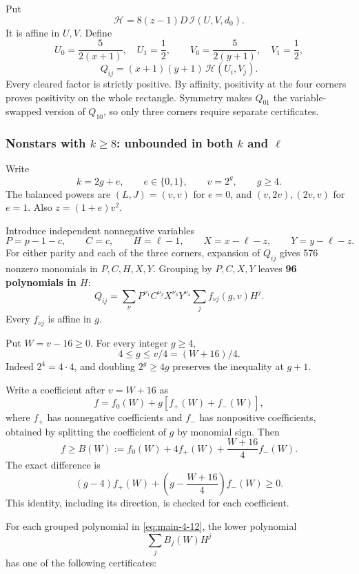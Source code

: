 \documentclass[11pt,letterpaper]{article}
\theoremstyle{plain}
\begin{document}
Put \[
\mathcal H=8(z-1)D\,\mathcal I(U,V,d_0).
\tag{4.9}\label{eq:main-4-9}
\] It is affine in \(U,V\). Define \[
U_0=\frac5{2(x+1)},\quad U_1=\frac12,
\qquad
V_0=\frac5{2(y+1)},\quad V_1=\frac12,
\] \[
Q_{ij}=(x+1)(y+1)\,\mathcal H(U_i,V_j).
\tag{4.10}\label{eq:main-4-10}
\] Every cleared factor is strictly positive. By affinity, positivity at the four corners proves positivity on the whole rectangle. Symmetry makes \(Q_{01}\) the variable-swapped version of \(Q_{10}\), so only three corners require separate certificates.

\subsubsection*{\texorpdfstring{Nonstars with \(k\ge8\): unbounded in both \(k\) and \(\ell\)}{Nonstars with k >= 8: unbounded in k and ell}}\label{nonstars-with-kge8-unbounded-in-both-k-and-ell}

Write \[
k=2g+e,\qquad e\in\{0,1\},\qquad v=2^g,\qquad g\ge4.
\] The balanced powers are \((L,J)=(v,v)\) for \(e=0\), and \((v,2v),(2v,v)\) for \(e=1\). Also \(z=(1+e)v^2\).

Introduce independent nonnegative variables \[
P=p-1-c,\qquad C=c,\qquad H=\ell-1,
\qquad X=x-\ell-z,\qquad Y=y-\ell-z.
\tag{4.11}\label{eq:main-4-11}
\] For either parity and each of the three corners, expansion of \(Q_{ij}\) gives 576 nonzero monomials in \(P,C,H,X,Y\). Grouping by \(P,C,X,Y\) leaves \textbf{96 polynomials in \(H\)}: \[
Q_{ij}=\sum_{\nu}P^{\nu_1}C^{\nu_2}X^{\nu_3}Y^{\nu_4}
       \sum_j f_{\nu j}(g,v)H^j.
\tag{4.12}\label{eq:main-4-12}
\] Every \(f_{\nu j}\) is affine in \(g\).

Put \(W=v-16\ge0\). For every integer \(g\ge4\), \[
\boxed{4\le g\le v/4=(W+16)/4.}
\tag{4.13}\label{eq:main-4-13}
\] Indeed \(2^4=4\cdot4\), and doubling \(2^g\ge4g\) preserves the inequality at \(g+1\).

Write a coefficient after \(v=W+16\) as \[
f=f_0(W)+g[f_+(W)+f_-(W)],
\] where \(f_+\) has nonnegative coefficients and \(f_-\) has nonpositive coefficients, obtained by splitting the coefficient of \(g\) by monomial sign. Then \[
\boxed{f\ge B(W):=f_0(W)+4f_+(W)+\frac{W+16}{4}f_-(W).}
\tag{4.14}\label{eq:main-4-14}
\] The exact difference is \[
(g-4)f_+(W)+\left(g-\frac{W+16}{4}\right)f_-(W)\ge0.
\] This identity, including its direction, is checked for each coefficient.

For each grouped polynomial in \eqref{eq:main-4-12}, the lower polynomial \[
\sum_j B_j(W)H^j
\] has one of the following certificates:
\end{document}
